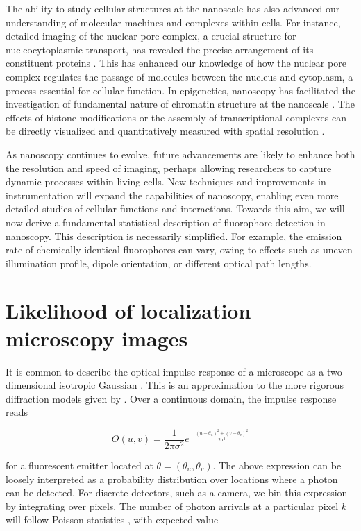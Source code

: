 The ability to study cellular structures at the nanoscale has also advanced our understanding of molecular machines and complexes within cells. For instance, detailed imaging of the nuclear pore complex, a crucial structure for nucleocytoplasmic transport, has revealed the precise arrangement of its constituent proteins \parencite{Wang2023}. This has enhanced our knowledge of how the nuclear pore complex regulates the passage of molecules between the nucleus and cytoplasm, a process essential for cellular function. In epigenetics, nanoscopy has facilitated the investigation of fundamental nature of chromatin structure at the nanoscale \parencite{Ricci2015}. The effects of histone modifications or the assembly of transcriptional complexes can be directly visualized and quantitatively measured with spatial resolution \parencite{Ricci2015,Nozaki2017,Boettiger2016}.

As nanoscopy continues to evolve, future advancements are likely to enhance both the resolution and speed of imaging, perhaps allowing researchers to capture dynamic processes within living cells. New techniques and improvements in instrumentation will expand the capabilities of nanoscopy, enabling even more detailed studies of cellular functions and interactions. Towards this aim, we will now derive a fundamental statistical description of fluorophore detection in nanoscopy. This description is necessarily simplified. For example, the emission rate of chemically identical fluorophores can vary, owing to effects such as uneven illumination profile, dipole orientation, or different optical path lengths.


\section{Likelihood of localization microscopy images}

It is common to describe the optical impulse response of a microscope as a two-dimensional isotropic Gaussian \parencite{Zhang2007}. This is an approximation to the more rigorous diffraction models given by \parencite{Richards1959,Gibson1989}. Over a continuous domain, the impulse response reads

\begin{equation}
O(u,v) = \frac{1}{2\pi\sigma^{2}}e^{-\frac{(u-\theta_{u})^{2}+(v-\theta_{v})^{2}}{2\sigma^{2}}}
\end{equation}

for a fluorescent emitter located at $\theta = (\theta_u,\theta_v)$. The above expression can be loosely interpreted as a probability distribution over locations where a photon can be detected. For discrete detectors, such as a camera, we bin this expression by integrating over pixels. The number of photon arrivals at a particular pixel $k$ will follow Poisson statistics \parencite{Smith2010,Huang2013}, with expected value

